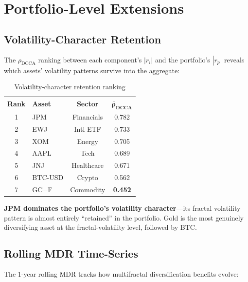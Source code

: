 \documentclass[11pt,a4paper]{article}
\begin{document}
\section{Portfolio-Level Extensions}

\subsection{Volatility-Character Retention}

The $\rho_{\text{DCCA}}$ ranking between each component's $|r_i|$ and the portfolio's $|r_p|$ reveals which assets' volatility patterns survive into the aggregate:

\begin{table}[H]
\centering
\caption{Volatility-character retention ranking}
\begin{tabular}{clcc}
\toprule
\textbf{Rank} & \textbf{Asset} & \textbf{Sector} & $\boldsymbol{\overline{\rho}_{\text{DCCA}}}$ \\
\midrule
1 & JPM     & Financials & 0.782 \\
2 & EWJ     & Intl ETF   & 0.733 \\
3 & XOM     & Energy     & 0.705 \\
4 & AAPL    & Tech       & 0.689 \\
5 & JNJ     & Healthcare & 0.671 \\
6 & BTC-USD & Crypto     & 0.562 \\
7 & GC=F    & Commodity  & \textbf{0.452} \\
\bottomrule
\end{tabular}
\end{table}

\begin{importantbox}
\textbf{JPM dominates the portfolio's volatility character}---its fractal volatility pattern is almost entirely ``retained'' in the portfolio. Gold is the most genuinely diversifying asset at the fractal-volatility level, followed by BTC.
\end{importantbox}

\subsection{Rolling MDR Time-Series}

The 1-year rolling MDR tracks how multifractal diversification benefits evolve:
\end{document}
